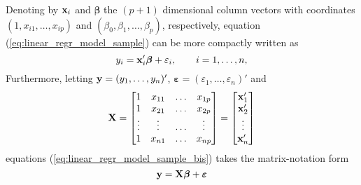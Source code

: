 Denoting by $\mathbf x_{i}$ and $\boldsymbol\beta$ the $(p+1)$ dimensional
column vectors with coordinates $(1, x_{i1}, \dots, x_{ip})$ and $(\beta_{0},
\beta_{1}, \dots, \beta_{p})$, respectively, equation
(\ref{eq:linear_regr_model_sample}) can be more compactly written as
%
\begin{equation}
    \label{eq:linear_regr_model_sample_bis}
    y_{i} = \stvec{x}_{i}'\boldsymbol\beta + \varepsilon_{i},
    \qquad i = 1, \dots, n, %
\end{equation}
%
Furthermore, letting $\mathbf y = (y_{1}, \dots, y_{n})'$,
$\boldsymbol\varepsilon = (\varepsilon_{1}, \dots, \varepsilon_{n})'$ and
\[
    \mathbf X = 
    \begin{bmatrix}
        1       & x_{11} & \dots & x_{1p} \\
        1       & x_{21} & \dots & x_{2p} \\
        \vdots  & \vdots & \dots & \vdots \\
        1       & x_{n1} & \dots & x_{np}
    \end{bmatrix}
    = 
    \begin{bmatrix}
        \mathbf x_{1}' \\
        \mathbf x_{2}' \\
        \vdots         \\
        \mathbf x_{n}'
    \end{bmatrix}
\]
equations (\ref{eq:linear_regr_model_sample_bis}) takes the matrix-notation form
\[
    \mathbf y = \mathbf X\boldsymbol\beta + \boldsymbol\varepsilon
\]

